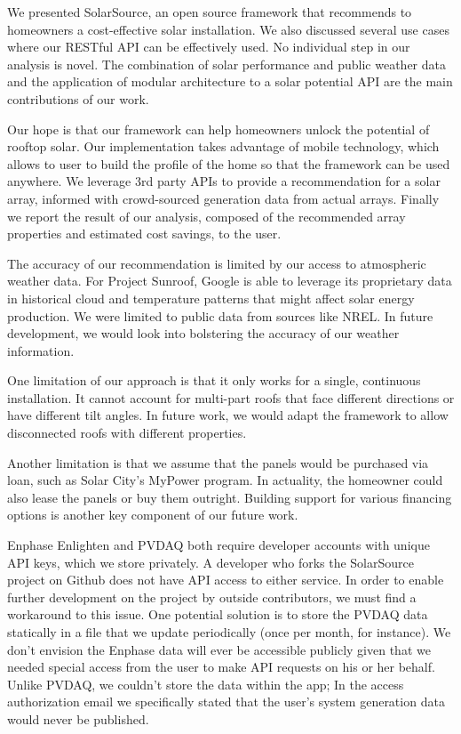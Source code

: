 \documentclass[pageno]{jpaper}
\begin{document}
We presented SolarSource, an open source framework that recommends to homeowners a cost-effective solar installation. We also discussed several use cases where our RESTful API can be effectively used. No individual step in our analysis is novel. The combination of solar performance and public weather data and the application of modular architecture to a solar potential API are the main contributions of our work.

Our hope is that our framework can help homeowners unlock the potential of rooftop solar. Our implementation takes advantage of mobile technology, which allows to user to build the profile of the home so that the framework can be used anywhere. We leverage 3rd party APIs to provide a recommendation for a solar array, informed with crowd-sourced generation data from actual arrays. Finally we report the result of our analysis, composed of the recommended array properties and estimated cost savings, to the user.

The accuracy of our recommendation is limited by our access to atmospheric weather data. For Project Sunroof, Google is able to leverage its proprietary data in historical cloud and temperature patterns that might affect solar energy production. We were limited to public data from sources like NREL. In future development, we would look into bolstering the accuracy of our weather information.

One limitation of our approach is that it only works for a single, continuous installation. It cannot account for multi-part roofs that face different directions or have different tilt angles. In future work, we would adapt the framework to allow disconnected roofs with different properties.

Another limitation is that we assume that the panels would be purchased via loan, such as Solar City's MyPower program. In actuality, the homeowner could also lease the panels or buy them outright. Building support for various financing options is another key component of our future work.

Enphase Enlighten and PVDAQ both require developer accounts with unique API keys, which we store privately. A developer who forks the SolarSource project on Github does not have API access to either service. In order to enable further development on the project by outside contributors, we must find a workaround to this issue. One potential solution is to store the PVDAQ data statically in a file that we update periodically (once per month, for instance). We don't envision the Enphase data will ever be accessible publicly given that we needed special access from the user to make API requests on his or her behalf. Unlike PVDAQ, we couldn't store the data within the app; In the access authorization email we specifically stated that the user's system generation data would never be published.
\end{document}
